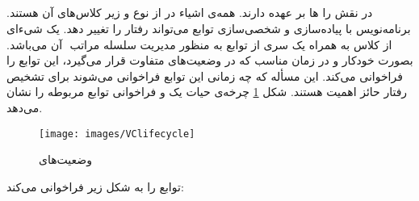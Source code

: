 \documentclass[oneside]{report}
\begin{document}
\subsection{{\small {}}}
 در 
   {\normalsize {}}
  نقش 
    {\normalsize {}} 
    را 
     {\normalsize {}} ها
     بر عهده دارند. همه‌ی اشیاء 
       {\normalsize {}}  
در 
  {\normalsize {}}
  از نوع 
      {\normalsize {}}
  و زیر کلاس‌های آن هستند. 
  برنامه‌نویس با پیاده‌سازی و شخصی‌سازی توابع 
         {\normalsize {}}  
   می‌تواند رفتار 
          {\normalsize {}}  
          را تغییر دهد.       
    یک شیءای از کلاس
    {\normalsize {}}
     به همراه یک سری از توابع به منظور مدیریت سلسله مراتب 
     {\normalsize {}} ‌
     آن می‌باشد. 
     {\normalsize {}}
     بصورت خودکار و در زمان مناسب که 
     {\normalsize {}} 
     در وضعیت‌های متفاوت قرار می‌گیرد،
     این توابع را فراخوانی می‌کند.  
     این مسأله که چه زمانی این توابع فراخوانی می‌شوند برای تشخیص رفتار 
     {\normalsize {}} 
     حائز اهمیت هستند. 
     شکل 
     \ref{fig:vclifecycle}
     چرخه‌ی حیات یک 
          {\normalsize {}} 
     و فراخوانی توابع مربوطه را نشان می‌دهد.
	\begin{figure}[h]
		\centering
		\texttt{[image: images/VClifecycle]}
		\caption{وضعیت‌های {\footnotesize {}} }
		\label{fig:vclifecycle}
	\end{figure}
	{\normalsize {}} 
توابع را به شکل زیر فراخوانی می‌کند: 
\end{document}
